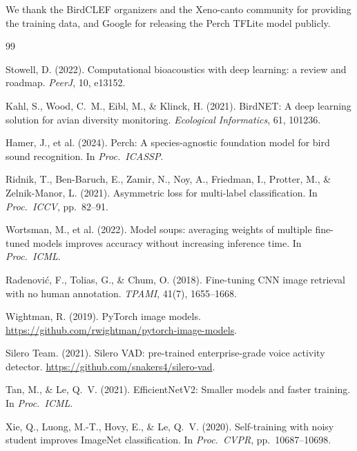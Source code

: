 \documentclass[10pt,twocolumn]{article}
\begin{document}
We thank the BirdCLEF organizers and the Xeno-canto community for providing
the training data, and Google for releasing the Perch TFLite model publicly.


\begin{thebibliography}{99}

Stowell, D. (2022).
\newblock Computational bioacoustics with deep learning: a review and roadmap.
\newblock \emph{PeerJ}, 10, e13152.

Kahl, S., Wood, C.~M., Eibl, M., \& Klinck, H. (2021).
\newblock BirdNET: A deep learning solution for avian diversity monitoring.
\newblock \emph{Ecological Informatics}, 61, 101236.

Hamer, J., et al. (2024).
\newblock Perch: A species-agnostic foundation model for bird sound recognition.
\newblock In \emph{Proc.\ ICASSP}.

Ridnik, T., Ben-Baruch, E., Zamir, N., Noy, A., Friedman, I., Protter, M., \& Zelnik-Manor, L. (2021).
\newblock Asymmetric loss for multi-label classification.
\newblock In \emph{Proc.\ ICCV}, pp.\ 82--91.

Wortsman, M., et al. (2022).
\newblock Model soups: averaging weights of multiple fine-tuned models improves accuracy without increasing inference time.
\newblock In \emph{Proc.\ ICML}.

Radenović, F., Tolias, G., \& Chum, O. (2018).
\newblock Fine-tuning CNN image retrieval with no human annotation.
\newblock \emph{TPAMI}, 41(7), 1655--1668.

Wightman, R. (2019).
\newblock PyTorch image models.
\newblock \url{https://github.com/rwightman/pytorch-image-models}.

Silero Team. (2021).
\newblock Silero VAD: pre-trained enterprise-grade voice activity detector.
\newblock \url{https://github.com/snakers4/silero-vad}.

Tan, M., \& Le, Q.~V. (2021).
\newblock EfficientNetV2: Smaller models and faster training.
\newblock In \emph{Proc.\ ICML}.

Xie, Q., Luong, M.-T., Hovy, E., \& Le, Q.~V. (2020).
\newblock Self-training with noisy student improves ImageNet classification.
\newblock In \emph{Proc.\ CVPR}, pp.\ 10687--10698.

\end{thebibliography}
\end{document}
